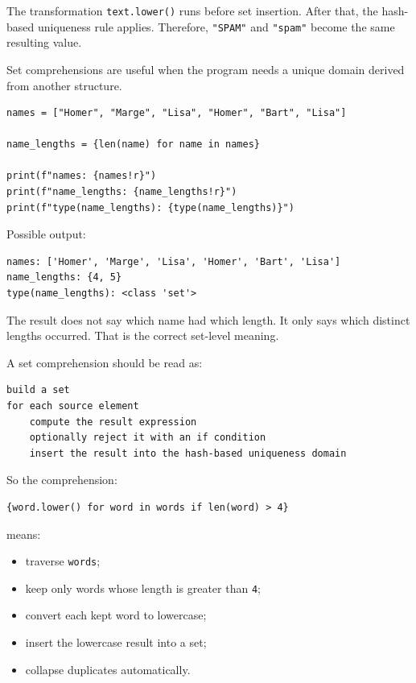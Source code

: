 The transformation \texttt{text.lower()} runs before set insertion. After that, the hash-based uniqueness rule applies. Therefore, \texttt{"SPAM"} and \texttt{"spam"} become the same resulting value.

Set comprehensions are useful when the program needs a unique domain derived from another structure.

\begin{verbatim}
names = ["Homer", "Marge", "Lisa", "Homer", "Bart", "Lisa"]

name_lengths = {len(name) for name in names}

print(f"names: {names!r}")
print(f"name_lengths: {name_lengths!r}")
print(f"type(name_lengths): {type(name_lengths)}")
\end{verbatim}

Possible output:

\begin{verbatim}
names: ['Homer', 'Marge', 'Lisa', 'Homer', 'Bart', 'Lisa']
name_lengths: {4, 5}
type(name_lengths): <class 'set'>
\end{verbatim}

The result does not say which name had which length. It only says which distinct lengths occurred. That is the correct set-level meaning.

A set comprehension should be read as:

\begin{verbatim}
build a set
for each source element
    compute the result expression
    optionally reject it with an if condition
    insert the result into the hash-based uniqueness domain
\end{verbatim}

So the comprehension:

\begin{verbatim}
{word.lower() for word in words if len(word) > 4}
\end{verbatim}

means:

\begin{itemize}
    \item traverse \texttt{words};
    \item keep only words whose length is greater than \texttt{4};
    \item convert each kept word to lowercase;
    \item insert the lowercase result into a set;
    \item collapse duplicates automatically.
\end{itemize}

